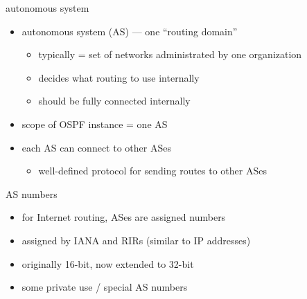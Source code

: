 \begin{frame}{autonomous system}
\begin{itemize}
    \item autonomous system (AS) --- one ``routing domain''
    \begin{itemize}
        \item typically = set of networks administrated by one organization
        \item decides what routing to use internally
        \item should be fully connected internally
    \end{itemize}
    \item scope of OSPF instance = one AS
    \item each AS can connect to other ASes
        \begin{itemize}
        \item well-defined protocol for sending routes to other ASes
        \end{itemize}
\end{itemize}
\end{frame}

\begin{frame}{AS numbers}
    \begin{itemize}
    \item for Internet routing, ASes are assigned numbers
    \vspace{.5cm}
    \item assigned by IANA and RIRs (similar to IP addresses)
    \item originally 16-bit, now extended to 32-bit
    \item some private use / special AS numbers 
    \end{itemize}
\end{frame}
